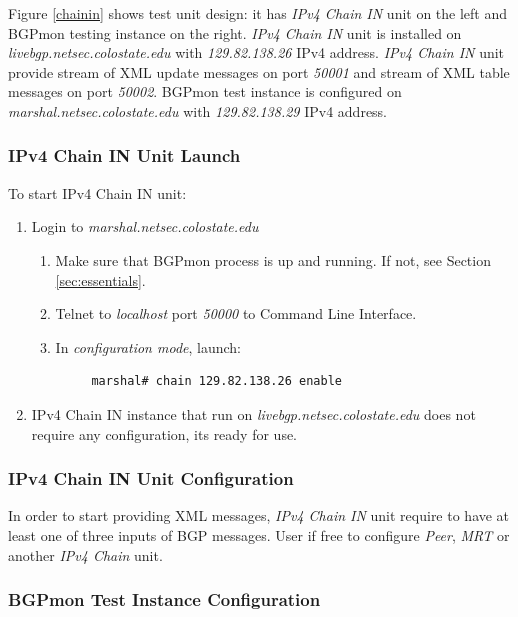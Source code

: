Figure \ref{chainin} shows test unit design: it has \emph{IPv4 Chain IN} unit on the left  and BGPmon testing instance on the right.  \emph{IPv4 Chain IN} unit is installed on \emph{livebgp.netsec.colostate.edu} with \emph{129.82.138.26} IPv4 address. \emph{IPv4 Chain IN} unit provide stream of XML update messages on port \emph{50001} and stream of XML table messages on port \emph{50002}. BGPmon test instance is configured on \emph{marshal.netsec.colostate.edu} with \emph{129.82.138.29} IPv4 address.

\subsubsection{IPv4 Chain IN Unit Launch}

To start IPv4 Chain IN unit:

\begin{enumerate}
\item{Login to \emph{marshal.netsec.colostate.edu}}
  \begin{enumerate}
  \item{Make sure that BGPmon process is up and running. If not, see Section \ref{sec:essentials}.}
  \item{Telnet to \emph{localhost} port \emph{50000} to Command Line Interface.}
  \item{In \emph{configuration mode}, launch:}
    \begin{verbatim}
     marshal# chain 129.82.138.26 enable
    \end{verbatim}
  \end{enumerate}
\item{IPv4 Chain IN instance that run on \emph{livebgp.netsec.colostate.edu} does not require any configuration, its ready for use.}
\end{enumerate}

\subsubsection{IPv4 Chain IN Unit Configuration}

In order to start providing XML messages,  \emph{IPv4 Chain IN} unit require to have at least one of three inputs of BGP messages. User if free to configure \emph{Peer}, \emph{MRT} or another \emph{IPv4 Chain} unit.

\subsubsection{BGPmon Test Instance Configuration}


